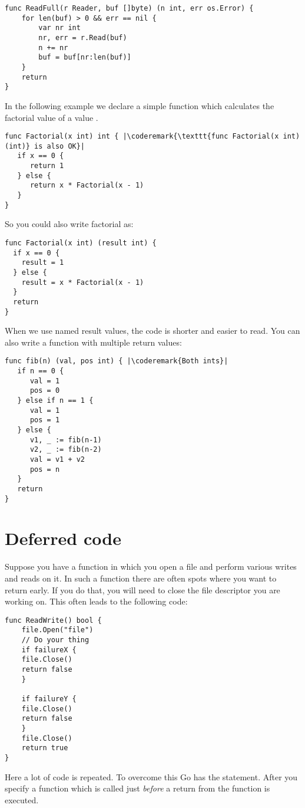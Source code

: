 \begin{lstlisting}
func ReadFull(r Reader, buf []byte) (n int, err os.Error) {
    for len(buf) > 0 && err == nil {
        var nr int
        nr, err = r.Read(buf)
        n += nr
        buf = buf[nr:len(buf)]
    }
    return
}
\end{lstlisting}
In the following example we declare a simple function which calculates
the factorial value of a value .
\begin{lstlisting}
func Factorial(x int) int { |\coderemark{\texttt{func Factorial(x int) (int)} is also OK}|
   if x == 0 {
      return 1
   } else {
      return x * Factorial(x - 1)
   }
}
\end{lstlisting}
So you could also write factorial as:
\begin{lstlisting}
func Factorial(x int) (result int) {
  if x == 0 {
    result = 1	
  } else {
    result = x * Factorial(x - 1)
  }
  return
}
\end{lstlisting}
When we use named result values, the code is shorter and
easier to read.
You can also write a function with multiple return values:
\begin{lstlisting}
func fib(n) (val, pos int) { |\coderemark{Both ints}|
   if n == 0 {
      val = 1
      pos = 0
   } else if n == 1 {
      val = 1
      pos = 1
   } else {
      v1, _ := fib(n-1)
      v2, _ := fib(n-2)
      val = v1 + v2
      pos = n
   }
   return
}
\end{lstlisting}

\section{Deferred code}
\label{sec:deferred code}
Suppose you have a function in which you open a file and perform various
writes and reads on it. In such a function there are often spots where
you want to return early. If you do that, you will need to close the file
descriptor you are working on. This often leads to the following code:
\begin{lstlisting}[caption=Without defer]
func ReadWrite() bool {
    file.Open("file")
    // Do your thing
    if failureX {
	file.Close()
	return false
    }

    if failureY {
	file.Close()
	return false
    }
    file.Close()
    return true
}
\end{lstlisting}
Here a lot of code is repeated. To overcome this Go has the
 statement. After
 you specify a function which is called just \emph{before} a
return from the function is executed.

